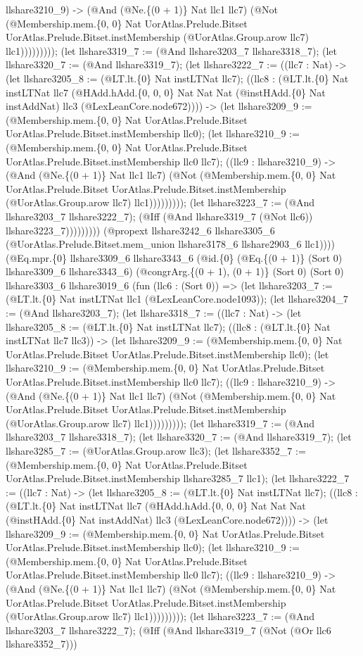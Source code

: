 \documentclass[11pt]{article}
\begin{document}
llshare3210\_9) -> (@And (@Ne.\{(0 + 1)\} Nat llc1 llc7) (@Not (@Membership.mem.\{0, 0\} Nat UorAtlas.Prelude.Bitset UorAtlas.Prelude.Bitset.instMembership (@UorAtlas.Group.arow llc7) llc1))))))))); (let llshare3319\_7 := (@And llshare3203\_7 llshare3318\_7); (let llshare3320\_7 := (@And llshare3319\_7); (let llshare3222\_7 := ((llc7 : Nat) -> (let llshare3205\_8 := (@LT.lt.\{0\} Nat instLTNat llc7); ((llc8 : (@LT.lt.\{0\} Nat instLTNat llc7 (@HAdd.hAdd.\{0, 0, 0\} Nat Nat Nat (@instHAdd.\{0\} Nat instAddNat) llc3 (@LexLeanCore.node672)))) -> (let llshare3209\_9 := (@Membership.mem.\{0, 0\} Nat UorAtlas.Prelude.Bitset UorAtlas.Prelude.Bitset.instMembership llc0); (let llshare3210\_9 := (@Membership.mem.\{0, 0\} Nat UorAtlas.Prelude.Bitset UorAtlas.Prelude.Bitset.instMembership llc0 llc7); ((llc9 : llshare3210\_9) -> (@And (@Ne.\{(0 + 1)\} Nat llc1 llc7) (@Not (@Membership.mem.\{0, 0\} Nat UorAtlas.Prelude.Bitset UorAtlas.Prelude.Bitset.instMembership (@UorAtlas.Group.arow llc7) llc1))))))))); (let llshare3223\_7 := (@And llshare3203\_7 llshare3222\_7); (@Iff (@And llshare3319\_7 (@Not llc6)) llshare3223\_7))))))))) (@propext llshare3242\_6 llshare3305\_6 (@UorAtlas.Prelude.Bitset.mem\_union llshare3178\_6 llshare2903\_6 llc1)))) (@Eq.mpr.\{0\} llshare3309\_6 llshare3343\_6 (@id.\{0\} (@Eq.\{(0 + 1)\} (Sort 0) llshare3309\_6 llshare3343\_6) (@congrArg.\{(0 + 1), (0 + 1)\} (Sort 0) (Sort 0) llshare3303\_6 llshare3019\_6 (fun (llc6 : (Sort 0)) => (let llshare3203\_7 := (@LT.lt.\{0\} Nat instLTNat llc1 (@LexLeanCore.node1093)); (let llshare3204\_7 := (@And llshare3203\_7); (let llshare3318\_7 := ((llc7 : Nat) -> (let llshare3205\_8 := (@LT.lt.\{0\} Nat instLTNat llc7); ((llc8 : (@LT.lt.\{0\} Nat instLTNat llc7 llc3)) -> (let llshare3209\_9 := (@Membership.mem.\{0, 0\} Nat UorAtlas.Prelude.Bitset UorAtlas.Prelude.Bitset.instMembership llc0); (let llshare3210\_9 := (@Membership.mem.\{0, 0\} Nat UorAtlas.Prelude.Bitset UorAtlas.Prelude.Bitset.instMembership llc0 llc7); ((llc9 : llshare3210\_9) -> (@And (@Ne.\{(0 + 1)\} Nat llc1 llc7) (@Not (@Membership.mem.\{0, 0\} Nat UorAtlas.Prelude.Bitset UorAtlas.Prelude.Bitset.instMembership (@UorAtlas.Group.arow llc7) llc1))))))))); (let llshare3319\_7 := (@And llshare3203\_7 llshare3318\_7); (let llshare3320\_7 := (@And llshare3319\_7); (let llshare3285\_7 := (@UorAtlas.Group.arow llc3); (let llshare3352\_7 := (@Membership.mem.\{0, 0\} Nat UorAtlas.Prelude.Bitset UorAtlas.Prelude.Bitset.instMembership llshare3285\_7 llc1); (let llshare3222\_7 := ((llc7 : Nat) -> (let llshare3205\_8 := (@LT.lt.\{0\} Nat instLTNat llc7); ((llc8 : (@LT.lt.\{0\} Nat instLTNat llc7 (@HAdd.hAdd.\{0, 0, 0\} Nat Nat Nat (@instHAdd.\{0\} Nat instAddNat) llc3 (@LexLeanCore.node672)))) -> (let llshare3209\_9 := (@Membership.mem.\{0, 0\} Nat UorAtlas.Prelude.Bitset UorAtlas.Prelude.Bitset.instMembership llc0); (let llshare3210\_9 := (@Membership.mem.\{0, 0\} Nat UorAtlas.Prelude.Bitset UorAtlas.Prelude.Bitset.instMembership llc0 llc7); ((llc9 : llshare3210\_9) -> (@And (@Ne.\{(0 + 1)\} Nat llc1 llc7) (@Not (@Membership.mem.\{0, 0\} Nat UorAtlas.Prelude.Bitset UorAtlas.Prelude.Bitset.instMembership (@UorAtlas.Group.arow llc7) llc1))))))))); (let llshare3223\_7 := (@And llshare3203\_7 llshare3222\_7); (@Iff (@And llshare3319\_7 (@Not (@Or llc6 llshare3352\_7))) 
\end{document}
